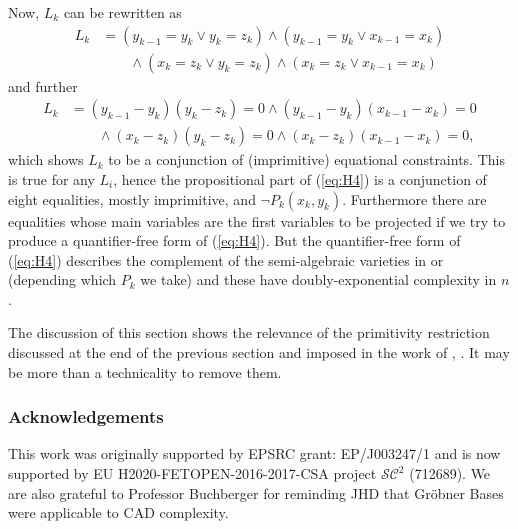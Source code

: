 \documentclass{llncs}
\begin{document}
Now, $L_k$ can be rewritten as
\begin{align}
\label{eq:H5}
L_k &= (y_{k-1} = y_k\lor y_{k}=z_k) \land (y_{k-1}=y_k\lor x_{k-1}=x_k) \nonumber \\
&\qquad \land (x_{k}=z_k\lor y_{k}=z_k)\land(x_{k}=z_k\lor x_{k-1}=x_k)
\end{align}
and further
\begin{align}
\label{eq:H6}
L_k &= (y_{k-1}-y_k)( y_{k}-z_k)=0\land(y_{k-1}-y_k)( x_{k-1}-x_k)=0 \nonumber \\
&\qquad \land (x_{k}-z_k)( y_{k}-z_k)=0\land(x_{k}-z_k)( x_{k-1}-x_k)=0,
\end{align}
which shows $L_k$ to be a conjunction of (imprimitive) equational constraints. This is true for any $L_i$, hence  the propositional part of (\ref{eq:H4}) is a conjunction of eight equalities, mostly imprimitive, and $\neg P_k(x_k,y_k)$.  Furthermore there are equalities whose main variables are the first variables to be projected if we try to produce a quantifier-free form of (\ref{eq:H4}). But the quantifier-free form of (\ref{eq:H4}) describes the complement of the semi-algebraic varieties in \cite{BD07} or \cite{DH88}  (depending which $P_k$ we take) and these have doubly-exponential complexity in $n$.

The discussion of this section shows the relevance of the primitivity restriction discussed at the end of the previous section and imposed in the work of \cite{EBD15}, \cite{ED16}.  It may be more than a technicality to remove them.


\subsubsection*{Acknowledgements}


This work was originally supported by EPSRC grant: EP/J003247/1 and is now supported by EU H2020-FETOPEN-2016-2017-CSA project $\mathcal{SC}^2$ (712689).  
We are also grateful to Professor Buchberger for reminding JHD that Gr\"obner Bases were applicable to CAD complexity.
\end{document}
